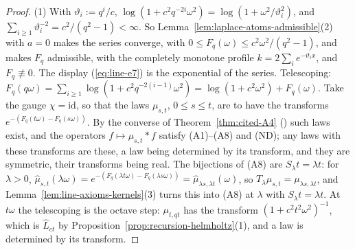 \begin{proof}
(1) With $\vartheta_i := q^i/c$, $\log(1 + c^2q^{-2i}\omega^2) = \log(1 + \omega^2/\vartheta_i^2)$,
and $\sum_{i \ge 1}\vartheta_i^{-2} = c^2/(q^2 - 1) < \infty$. So
Lemma~\ref{lem:laplace-atoms-admissible}(2) with $a = 0$ makes the series converge, with
$0 \le F_q(\omega) \le c^2\omega^2/(q^2 - 1)$, and makes $F_q$ admissible, with the completely
monotone profile $k = 2\sum_ie^{-\vartheta_ix}$, and $F_q \not\equiv 0$. The display (\ref{eq:line-e7}) is
the exponential of the series. Telescoping:
$F_q(q\omega) = \sum_{i \ge 1}\log(1 + c^2q^{-2(i-1)}\omega^2) = \log(1 + c^2\omega^2) + F_q(\omega)$.
Take the gauge $\chi = \mathrm{id}$, so that the laws $\mu_{s,t}$, $0 \le s \le t$, are to have the
transforms $e^{-(F_q(t\omega) - F_q(s\omega))}$. By the converse of Theorem~\ref{thm:cited-A4}
() such laws exist, and the operators $f \mapsto \mu_{s,t} * f$
satisfy (A1)--(A8) and (ND); any laws with these transforms are these, a law being determined by its
transform, and they are symmetric, their transforms being real. The bijections of (A8) are
$S_\lambda t = \lambda t$: for $\lambda > 0$,
$\widehat\mu_{s,t}(\lambda\omega) = e^{-(F_q(\lambda t\omega) - F_q(\lambda s\omega))} =
\widehat\mu_{\lambda s,\lambda t}(\omega)$, so $T_\lambda\mu_{s,t} = \mu_{\lambda s,\lambda t}$, and
Lemma~\ref{lem:line-axioms-kernels}(3) turns this into (A8) at $\lambda$ with
$S_\lambda t = \lambda t$. At $t\omega$ the
telescoping is the octave step: $\mu_{t,qt}$ has the transform $(1 + c^2t^2\omega^2)^{-1}$, which
is $\widehat L_{ct}$ by Proposition~\ref{prop:recursion-helmholtz}(1), and a law is determined by
its transform.


\end{proof}
